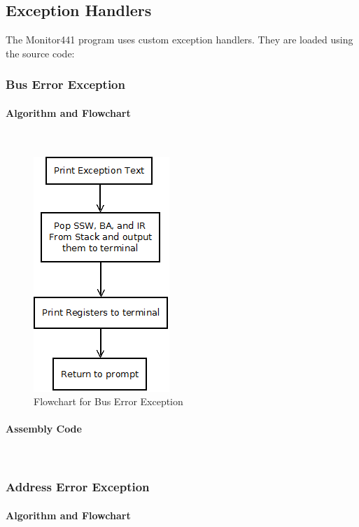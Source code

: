 \documentclass[12pt]{article}
\begin{document}
			\subsection{Exception Handlers}
			The Monitor441 program uses custom exception handlers. They are loaded using the source code:
			\subsubsection{Bus Error Exception}
			\paragraph{Algorithm and Flowchart}~\\
			
			
\begin{figure}[H]
\centering
\includegraphics[width=0.3\linewidth]{BERR}
\caption{Flowchart for Bus Error Exception}
\label{fig:BERR}
\end{figure}
			\paragraph{Assembly Code}~\\				
			
			
		
			\subsubsection{Address Error Exception}
			\paragraph{Algorithm and Flowchart}~\\
			
\end{document}
